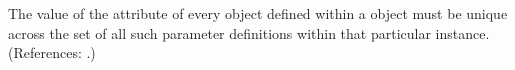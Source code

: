 The value of the attribute  of every \LocalParameter object
defined within a \KineticLaw object must be unique across the set of all
such parameter definitions within that particular \KineticLaw instance.
(References: .)
